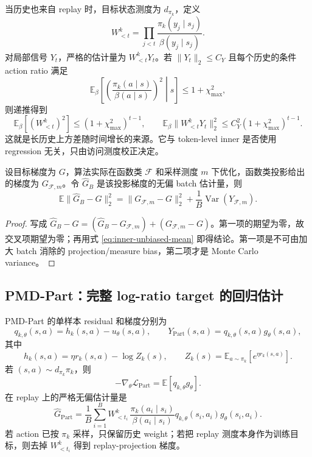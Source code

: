 当历史也来自 replay 时，目标状态测度为 $d_{\pi_k}$，定义
\[
 W^k_{<t}=\prod_{j<t}\frac{\pi_k(y_j\mid s_j)}{\beta(y_j\mid s_j)}.
\]
对局部信号 $Y_t$，严格的估计量为 $W^k_{<t}Y_t$。若 $\|Y_t\|_2\leq C_Y$ 且每个历史的条件 action ratio 满足
\[
 \mathbb E_\beta\left[\left(\frac{\pi_k(a\mid s)}{\beta(a\mid s)}\right)^2\middle|s\right]
 \leq 1+\chi_{\max}^2,
\]
则递推得到
\begin{equation}
\label{eq:历史-second-moment}
 \mathbb E_\beta[(W^k_{<t})^2]
 \leq (1+\chi_{\max}^2)^{t-1},
 \qquad
 \mathbb E_\beta\|W^k_{<t}Y_t\|_2^2
 \leq C_Y^2(1+\chi_{\max}^2)^{t-1}.
\end{equation}
这就是长历史上方差随时间增长的来源。它与 token-level inner 是否使用 regression 无关，只由访问测度校正决定。

\begin{proposition}[投影误差与抽样方差的正交分解]
\label{prop:projection-sampling-decomposition}
设目标梯度为 $G$，算法实际在函数类 $\mathcal F$ 和采样测度 $m$ 下优化，函数类投影给出的梯度为 $G_{\mathcal F,m}$。令 $\widehat G_B$ 是该投影梯度的无偏 batch 估计量，则
\[
 \mathbb E\|\widehat G_B-G\|_2^2
 =\|G_{\mathcal F,m}-G\|_2^2
 +\frac1B\operatorname{Var}(Y_{\mathcal F,m}).
\]
\end{proposition}

\begin{proof}
写成 $\widehat G_B-G=(\widehat G_B-G_{\mathcal F,m})+(G_{\mathcal F,m}-G)$。第一项的期望为零，故交叉项期望为零；再用式 \eqref{eq:inner-unbiased-mean} 即得结论。第一项是不可由加大 batch 消除的 projection/measure bias，第二项才是 Monte Carlo variance。
\end{proof}

\subsection{PMD-Part：完整 log-ratio target 的回归估计}
\label{subsec:estimator-part}

PMD-Part 的单样本 residual 和梯度分别为
\[
 q_{k,\theta}(s,a)=h_k(s,a)-u_\theta(s,a),
 \qquad
 Y_{\mathrm{Part}}(s,a)=q_{k,\theta}(s,a)g_\theta(s,a),
\]
其中
\[
 h_k(s,a)=\eta r_k(s,a)-\log Z_k(s),
 \qquad
 Z_k(s)=\mathbb E_{a\sim\pi_k}\left[e^{\eta r_k(s,a)}\right].
\]
若 $(s,a)\sim d_{\pi_k}\pi_k$，则
\[
 -\nabla_\theta\mathcal L_{\mathrm{Part}}
 =\mathbb E[q_{k,\theta}g_\theta].
\]
在 replay 上的严格无偏估计量是
\begin{equation}
\label{eq:part-unbiased-estimator}
 \widehat G_{\mathrm{Part}}
 =\frac1B\sum_{i=1}^B
 W^k_{<t_i}\,\frac{\pi_k(a_i\mid s_i)}{\beta(a_i\mid s_i)}
 q_{k,\theta}(s_i,a_i)g_\theta(s_i,a_i).
\end{equation}
若 action 已按 $\pi_k$ 采样，只保留历史 weight；若把 replay 测度本身作为训练目标，则去掉 $W^k_{<t_i}$ 得到 replay-projection 梯度。

